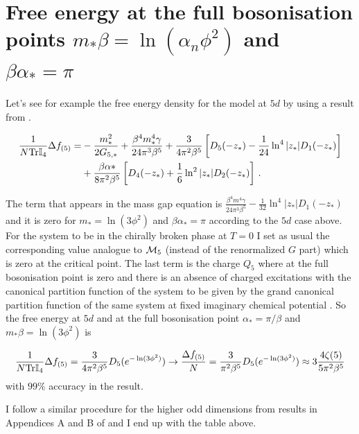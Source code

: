 \documentclass[twoside]{article}
\begin{document}
\section{Free energy at the full bosonisation points $m_*\beta=\ln(\alpha_n\phi^2)$ and $\beta\alpha_*=\pi$}

Let's see for example the free energy density for the model at $5d$ by using a result from \cite{Filothodoros:2018}.

\begin{align}
\label{GNfe5}
\frac{1}{N{\rm Tr}{\mathbb I}_{4}}\Delta f_{(5)} =&-\frac{m_*^2}{2G_{5,*}}+\frac{\beta^4 m_*^4\gamma}{24\pi^3 \beta^5}+\frac{3}{4\pi^2\beta^5}\left[D_5(-z_*)-\frac{1}{24}\ln^4|z_*|D_1(-z_*)\right]\nonumber\\
&+\frac{\beta\alpha*}{8\pi^2\beta^5}\left[D_4(-z_*)+\frac{1}{6}\ln^2|z_*|D_2(-z_*)\right]\,.
\end{align}

The term that appears in the mass gap equation is $\frac{\beta^4 m^4\gamma}{24\pi^3 \beta^5}-\frac{1}{32}\ln^4|z_*|D_1(-z_*)$ and it is zero for $m_*=\ln(3\phi^2)$ and $\beta\alpha_*=\pi$ according to the $5d$ case above. For the system to be in the chirally broken phase at $T=0$ I set as usual the corresponding value analogue to ${\cal M}_5$ (instead of the renormalized $G$ part) which is zero at the critical point. The last term is the charge $Q_5$ where at the full bosonisation point is zero and there is an absence of charged excitations with the canonical partition function of the system to be given by the grand canonical partition function of the same system at fixed imaginary chemical potential \cite{Filothodoros:2016txa}. So the free energy at $5d$ and at the full bosonisation point $\alpha_*=\pi/\beta$ and $m_*\beta=\ln(3\phi^2)$ is 

\begin{equation}
\frac{1}{N{\rm Tr}{\mathbb I}_{4}}\Delta f_{(5)}=\frac{3}{4\pi^2\beta^5}D_5(e^{-\ln(3\phi^2)})\rightarrow \frac{\Delta f_{(5)}}{N}=\frac{3}{{\pi^2\beta^5}}D_5(e^{-\ln(3\phi^2)})\approx 3\frac{4\zeta(5)}{5\pi^2\beta^5}
\end{equation}
with $99\%$ accuracy in the result.

I follow a similar procedure for the higher odd dimensions from results in Appendices A and B of \cite{Filothodoros:2018} and I end up with the table above.
\end{document}
